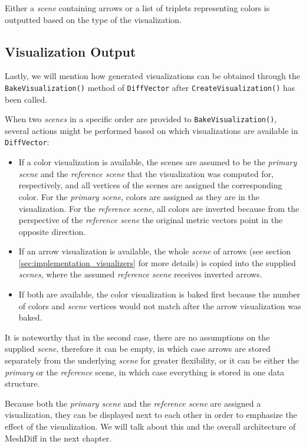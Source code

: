 Either a {\it scene} containing arrows or a list of triplets representing colors is outputted based on the type of the visualization.
\subsection{Visualization Output}
\label{sec:implementation-visualizers-output}

Lastly, we will mention how generated visualizations can be obtained through the \verb+BakeVisualization()+ method of \verb+DiffVector+ after \verb+CreateVisualization()+ has been called.

When two {\it scenes} in a specific order are provided to \verb+BakeVisualization()+, several actions might be performed based on which visualizations are available in \verb+DiffVector+:

\begin{itemize}
\item If a color visualization is available, the scenes are assumed to be the {\it primary scene} and the {\it reference scene} that the visualization was computed for, respectively, and all vertices of the scenes are assigned the corresponding color. For the {\it primary scene}, colors are assigned as they are in the visualization. For the {\it reference scene}, all colors are inverted because from the perspective of the {\it reference scene} the original metric vectors point in the opposite direction.
\item If an arrow visualization is available, the whole {\it scene} of arrows (see section \ref{sec:implementation_visualizers} for more details) is copied into the supplied {\it scenes}, where the assumed {\it reference scene} receives inverted arrows.
\item If both are available, the color visualization is baked first because the number of colors and {\it scene} vertices would not match after the arrow visualization was baked.
\end{itemize}

It is noteworthy that in the second case, there are no assumptions on the supplied {\it scene}, therefore it can be empty, in which case arrows are stored separately from the underlying {\it scene} for greater flexibility, or it can be either the {\it primary} or the {\it reference} scene, in which case everything is stored in one data structure.

Because both the {\it primary scene} and the {\it reference scene} are assigned a visualization, they can be displayed next to each other in order to emphasize the effect of the visualization. We will talk about this and the overall architecture of MeshDiff in the next chapter.
